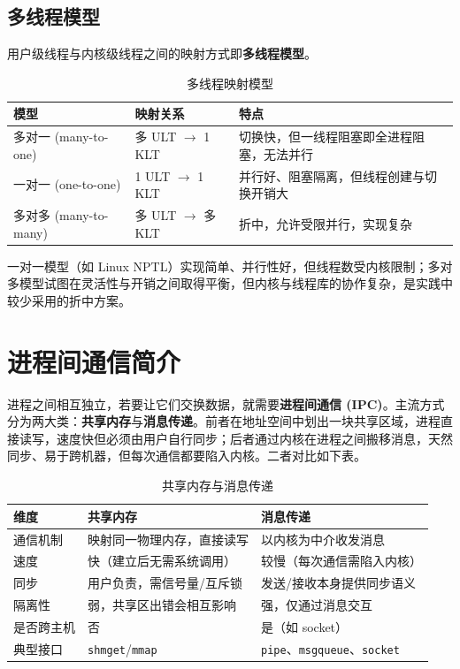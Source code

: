 \subsection{多线程模型}

\noindent 用户级线程与内核级线程之间的映射方式即\textbf{多线程模型}。

\begin{table}[H]
\centering
\caption{多线程映射模型}
\begin{tabulary}{\textwidth}{LLL}
\toprule
模型 & 映射关系 & 特点 \\
\midrule
多对一 (many-to-one) & 多 ULT $\to$ 1 KLT & 切换快，但一线程阻塞即全进程阻塞，无法并行 \\
一对一 (one-to-one) & 1 ULT $\to$ 1 KLT & 并行好、阻塞隔离，但线程创建与切换开销大 \\
多对多 (many-to-many) & 多 ULT $\to$ 多 KLT & 折中，允许受限并行，实现复杂 \\
\bottomrule
\end{tabulary}
\end{table}

\noindent 一对一模型（如 Linux NPTL）实现简单、并行性好，但线程数受内核限制；多对多模型试图在灵活性与开销之间取得平衡，但内核与线程库的协作复杂，是实践中较少采用的折中方案。

\section{进程间通信简介}

\noindent 进程之间相互独立，若要让它们交换数据，就需要\textbf{进程间通信 (IPC)}。主流方式分为两大类：\textbf{共享内存}与\textbf{消息传递}。前者在地址空间中划出一块共享区域，进程直接读写，速度快但必须由用户自行同步；后者通过内核在进程之间搬移消息，天然同步、易于跨机器，但每次通信都要陷入内核。二者对比如下表。

\begin{table}[H]
\centering
\caption{共享内存与消息传递}
\begin{tabulary}{\textwidth}{LLL}
\toprule
维度 & 共享内存 & 消息传递 \\
\midrule
通信机制 & 映射同一物理内存，直接读写 & 以内核为中介收发消息 \\
速度 & 快（建立后无需系统调用） & 较慢（每次通信需陷入内核） \\
同步 & 用户负责，需信号量/互斥锁 & 发送/接收本身提供同步语义 \\
隔离性 & 弱，共享区出错会相互影响 & 强，仅通过消息交互 \\
是否跨主机 & 否 & 是（如 socket） \\
典型接口 & \texttt{shmget}/\texttt{mmap} & \texttt{pipe}、\texttt{msgqueue}、\texttt{socket} \\
\bottomrule
\end{tabulary}
\end{table}

